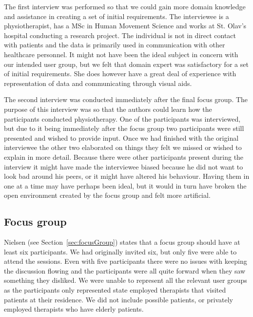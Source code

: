 The first interview was performed so that we could gain more domain knowledge and assistance in creating a set of initial requirements. The interviewee is a physiotherapist, has a MSc in Human Movement Science and works at St. Olav's hospital conducting a research project. The individual is not in direct contact with patients and the data is primarily used in communication with other healthcare personnel. It might not have been the ideal subject in concern with our intended user group, but we felt that domain expert was satisfactory for a set of initial requirements. She does however have a great deal of experience with representation of data and communicating through visual aids.

The second interview was conducted immediately after the final focus group. The purpose of this interview was so that the authors could learn how the participants conducted physiotherapy. One of the participants was interviewed, but due to it being immediately after the focus group two participants were still presented and wished to provide input. Once we had finished with the original interviewee the other two elaborated on things they felt we missed or wished to explain in more detail. Because there were other participants present during the interview it might have made the interviewee biased because he did not want to look bad around his peers, or it might have altered his behaviour. Having them in one at a time may have perhaps been ideal, but it would in turn have broken the open environment created by the focus group and felt more artificial.

\subsection{Focus group}
Nielsen (see Section~\ref{sec:focusGroup}) states that a focus group should have at least six participants. We had originally invited six, but only five were able to attend the sessions. Even with five participants there were no issues with keeping the discussion flowing and the participants were all quite forward when they saw something they disliked. We were unable to represent all the relevant user groups as the participants only represented state employed therapists that visited patients at their residence. We did not include possible patients, or privately employed therapists who have elderly patients.


